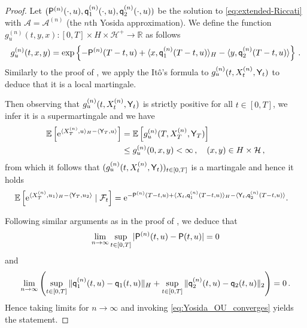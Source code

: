 \documentclass[10pt,a4paper,reqno]{amsart}
\newcommand*\E{\mathop{}\!\mathrm{e}}
\newcommand*\I{\mathop{}\!\textnormal{i}}
\numberwithin{equation}{section}
\theoremstyle{plain}
\theoremstyle{definition}
\theoremstyle{example}
\renewcommand{\MR}{\mathbb{R}}
\newcommand{\R}{\MR}
\newcommand{\cA}{\mathcal{A}}
\newcommand{\cH}{\mathcal{H}}
\newcommand{\llangle}{\langle\langle}
\newcommand{\rrangle}{\rangle\rangle}
\newcommand{\EX}[1]{\mathbb{E}\left[#1\right]}
\newcommand{\EXspec}[2]{\mathbb{E}_{#1}\left[#2\right]}
\newcommand{\cHplus}{\cH^{+}}
\begin{document}
\begin{proof}
Let $({\sf P}^{(n)}(\cdot, u), {\sf q}_1^{(n)}(\cdot, u), {\sf q}_2^{(n)}(\cdot,u))$ be the solution to \eqref{eq:extended-Riccati} with $\cA =\cA^{(n)}$ (the $n$th Yosida approximation). We define the function $g_u^{(n)}(t,y,x) \colon[0,T]\times H\times \cHplus \rightarrow \R$ as follows 
$$g_u^{(n)}(t,x,y) = \exp\left\{-{\sf P}^{(n)}(T-t, u)+ \langle x, {\sf q}^{(n)}_1(T-t,u)\rangle_H-\langle y,{\sf q}^{(n)}_2(T-t,u)\rangle\right\}\,.$$
Similarly to the proof of \cite[Theorem 3.3]{CKK22b}, we apply the It\^o's formula to $g_{u}^{(n)}(t,X^{(n)}_t, {\sf Y}_t)$ to deduce that it is a local martingale. 

  Then observing that $g_{u}^{(n)}(t,X_{t}^{(n)}, {\sf Y}_t)$ is strictly positive for all $t \in [0,T]$, we infer it is a
  supermartingale and we have
    \begin{align*}
  \EX{\E^{\langle X^{(n)}_{T}, u\rangle_H-\langle {\sf Y}_{T}, u\rangle }}&= \EX{g_{u}^{(n)}(T,X_{T}^{(n)}, {\sf Y}_T)}\\
    &\leq g_u^{(n)}(0,x,y) < \infty\,, \quad (x,y) \in H\times \cH\,,
  \end{align*}
  from which it follows that $(g_{u}^{(n)}(t,X_{t}^{(n)}, {\sf Y}_t))_{t\in [0,T]}$ is a martingale and hence it holds
  \begin{align*}
  \EX{\E^{\langle X_{T}^{(n)},u_1\rangle_H - \langle {\sf Y}_T, u_2\rangle} \mid \mathcal{F}_t}
    &=\E^{- {\sf P}^{(n)}(T-t,u)+\langle X_t, {\sf q}_1^{(n)}(T-t,u)\rangle_H - \langle {\sf Y}_t, {\sf q}_2^{(n)}(T-t,u)\rangle}.  
  \end{align*}

Following similar arguments as in the proof of \cite[Proposition 3.5]{CKK22b}, we deduce that
$$\lim_{n\rightarrow \infty} \sup_{t \in [0,T]}|{\sf P}^{(n)}(t,u) - {\sf P}(t,u)| =0$$
and 
$$\lim_{n\rightarrow \infty}\left( \sup_{t \in [0,T]} \|{\sf q}_1^{(n)}(t,u) - {\sf q}_1(t,u)\|_H + \sup_{t \in [0,T]} \|{\sf q}_2^{(n)}(t,u) - {\sf q}_2(t,u)\|_2\right) = 0\,. $$
Hence taking limits for $n \rightarrow \infty$ and invoking \eqref{eq:Yosida_OU_converges} yields the statement.
\end{proof}
\end{document}
